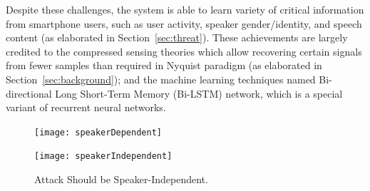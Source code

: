 %
%
%






Despite these challenges, the {\systemName} system is able to learn variety of critical information from smartphone users, such as user activity, speaker gender/identity, and speech content (as elaborated in Section~\ref{sec:threat}). 
These achievements are largely credited to the compressed sensing theories which allow recovering certain signals from fewer samples than required in Nyquist paradigm (as elaborated in Section~\ref{sec:background}); and the machine learning techniques named Bi-directional Long Short-Term Memory (Bi-LSTM) network, which is a special variant of recurrent neural networks. 




\begin{landscape}
	\begin{figure}[h]%
		\centering
		\begin{minipage}[c]{.45\linewidth}
				\texttt{[image: speakerDependent]}
		\end{minipage}
		\begin{minipage}[t]{.05\textwidth}
			\qquad
		\end{minipage}
		\begin{minipage}[c]{.45\linewidth}
				\texttt{[image: speakerIndependent]}
		\end{minipage}
		\caption{{\attackName} Attack Should be Speaker-Independent.} \label{fig:depend}
	\end{figure}
\end{landscape}

